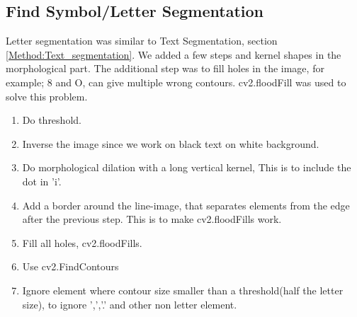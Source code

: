 \documentclass[Report.tex]{subfiles}
\begin{document}
\subsection{Find Symbol/Letter Segmentation}\label{subsec:Find_Symb}
Letter segmentation was similar to Text Segmentation, section \ref{Method:Text_segmentation}. We added a few steps and kernel shapes in the morphological part. The additional step was to fill holes in the image, for example; 8 and O, can give multiple wrong contours. cv2.floodFill was used to solve this problem.
\begin{enumerate}
  \item Do threshold. 
  \item Inverse the image since we work on black text on white background.
  \item Do morphological dilation with a long vertical kernel, This is to include the dot in 'i'.
  \item Add a border around the line-image, that separates elements from the edge after the previous step. This is to make cv2.floodFills work.
  \item Fill all holes, cv2.floodFills.
  \item Use cv2.FindContours
  \item Ignore element where contour size smaller than a threshold(half the letter size), to ignore ',','.' and other non letter element.
\end{enumerate}
\end{document}
